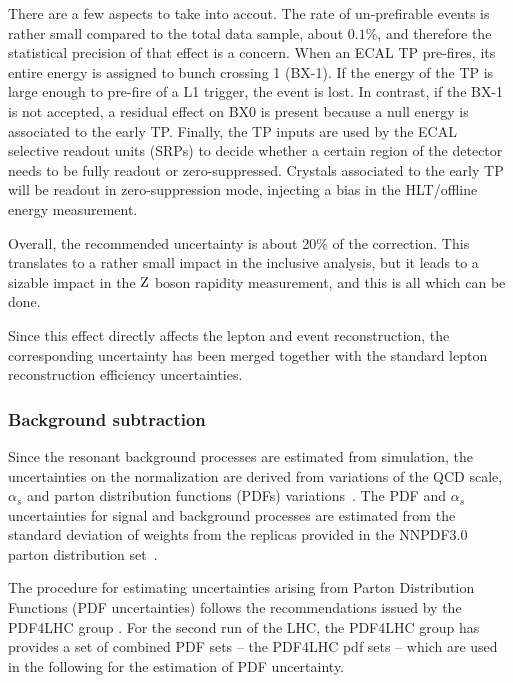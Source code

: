 There are a few aspects to take into accout. The rate of un-prefirable events 
is rather small compared to the total data sample, about $0.1\%$, and therefore 
the statistical precision of that effect is a concern. When an ECAL TP pre-fires, 
its entire energy is assigned to bunch crossing 1 (BX-1).
If the energy of the TP is large enough to pre-fire of a L1 trigger, the event is lost. 
In contrast, if the BX-1 is not accepted, 
a residual effect on BX0 is present because a null energy is associated to the 
early TP. Finally, the TP inputs are used by the ECAL selective readout units 
(SRPs) to decide whether a certain region of the detector needs to be fully 
readout or zero-suppressed. Crystals associated to the early TP will be readout 
in zero-suppression mode, injecting a bias in the HLT/offline energy measurement.

Overall, the recommended uncertainty is about 20\% of the correction. This translates 
to a rather small impact in the inclusive analysis, but it leads to a sizable impact 
in the $\mathrm{Z}$ boson rapidity measurement, and this is all which can be done.

Since this effect directly affects the lepton and event reconstruction, the
corresponding uncertainty has been merged together with the standard lepton
reconstruction efficiency uncertainties.

\subsubsection{Background subtraction}

Since the resonant background processes are estimated from simulation, the uncertainties on 
the normalization are derived from variations of the QCD scale, $\alpha_{s}$ and 
parton distribution functions (PDFs) variations~\cite{Botje:2011sn,Alekhin:2011sk,Lai:2010vv,Martin:2009iq,Ball:2011mu,MCFM}. 
The PDF and $\alpha_s$ uncertainties for signal and background processes are estimated 
from the standard deviation of weights from the replicas provided in the 
NNPDF3.0 parton distribution set~\cite{nnpdf}.

The procedure for estimating uncertainties arising from Parton
Distribution Functions (PDF uncertainties) follows the recommendations
issued by the PDF4LHC group \cite{Butterworth:2015oua}.
For the second run of the LHC, the PDF4LHC group has provides a set of combined
PDF sets -- the PDF4LHC pdf sets -- which are used in the following for the estimation
of PDF uncertainty.

